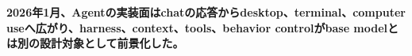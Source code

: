\noindent\textbf{2026年1月、Agentの実装面はchatの応答からdesktop、terminal、computer useへ広がり、harness、context、tools、behavior controlがbase modelとは別の設計対象として前景化した。}\autocite{src-a24fd97eb3d0,src-ae10eb4597fe,src-d8b7c1c36830,src-f6aa679babd7}
